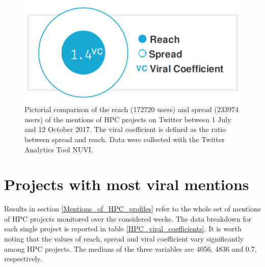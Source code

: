 \begin{figure}[!t] 
 \begin{center}
 \includegraphics[scale=0.3]{Images/HPC_viral_coefficient.png}
 \caption{Pictorial comparison of the reach (172720 users) and spread (233974 users) of the mentions of HPC projects on Twitter between 1 July and 12 October 2017. The viral coefficient is defined as the ratio between spread and reach. Data were collected with the Twitter Analytics Tool NUVI.}
 \label{HPC_viral_coefficient}
 \end{center}
\end{figure}

\section{Projects with most viral mentions} \label{Projects_with_most_viral_mentions}
Results in section \ref{Mentions_of_HPC_profiles} refer to the whole set of mentions of HPC projects monitored over the considered weeks. The data breakdown for each single project is reported in table \ref{HPC_viral_coefficients}. It is worth noting that the values of reach, spread and viral coefficient vary significantly among HPC projects. The medians of the three variables are 4056, 4836 and 0.7, respectively.     
 
